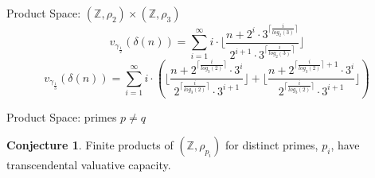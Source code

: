 \documentclass{beamer}
\theoremstyle{definition}
\newtheorem{conjecture}{Conjecture}
\begin{document}
\begin{frame}{Product Space: $(\mathbb{Z},\rho_2) \times (\mathbb{Z},\rho_3)$}
	 \[v_{\gamma_{\frac{1}{2}}}(\delta(n)) = \sum_{i=1}^\infty i \cdot \lfloor\frac{n + 2^i \cdot 3^{\lceil \frac{i}{log_2(3)}\rceil}}{2^{i+1}\cdot 3^{\lceil \frac{i}{log_2(3)}\rceil}} \rfloor\]
		\pause
	 \[v_{\gamma_{\frac{1}{3}}}(\delta(n)) = \sum_{i=1}^\infty i \cdot (\lfloor\frac{n + 2^{\lceil \frac{i}{log_3(2)}\rceil} \cdot 3^i}{2^{\lceil \frac{i}{log_3(2)}\rceil}\cdot 3^{i+1}} \rfloor + \lfloor\frac{n + 2^{\lceil \frac{i}{log_3(2)}\rceil+1} \cdot 3^i}{2^{\lceil \frac{i}{log_3(2)}\rceil}\cdot 3^{i+1}} \rfloor) \]
\end{frame}

\begin{frame}{Product Space: primes $p \neq q$}
\begin{conjecture} Finite products of $(\mathbb{Z}, \rho_{p_i})$ for distinct primes, $p_i$, have transcendental valuative capacity.\\ \end{conjecture}
\end{frame}
\end{document}
